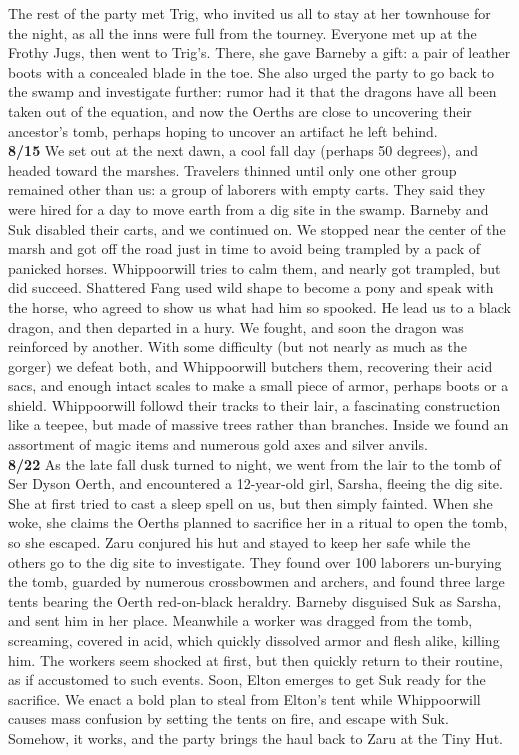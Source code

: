 \documentclass[letterpaper]{article}
\begin{document}
\noindent The rest of the party met Trig, who invited us all to stay at her townhouse for the night, as all the inns were full from the tourney.  Everyone met up at the Frothy Jugs, then went to Trig's.  There, she gave Barneby a gift: a pair of leather boots with a concealed blade in the toe. She also urged the party to go back to the swamp and investigate further: rumor had it that the dragons have all been taken out of the equation, and now the Oerths are close to uncovering their ancestor's tomb, perhaps hoping to uncover an artifact he left behind.\\

\noindent \textbf{8/15} We set out at the next dawn, a cool fall day (perhaps 50 degrees), and headed toward the marshes.  Travelers thinned until only one other group remained other than us: a group of laborers with empty carts.  They said they were hired for a day to move earth from a dig site in the swamp.  Barneby and Suk disabled their carts, and we continued on.  We stopped near the center of the marsh and got off the road just in time to avoid being trampled by a pack of panicked horses.  Whippoorwill tries to calm them, and nearly got trampled, but did succeed.  Shattered Fang used wild shape to become a pony and speak with the horse, who agreed to show us what had him so spooked.  He lead us to a black dragon, and then departed in a hury.  We fought, and soon the dragon was reinforced by another.  With some difficulty (but not nearly as much as the gorger) we defeat both, and Whippoorwill butchers them, recovering their acid sacs, and enough intact scales to make a small piece of armor, perhaps boots or a shield.  Whippoorwill followd their tracks to their lair, a fascinating construction like a teepee, but made of massive trees rather than branches.  Inside we found an assortment of magic items and numerous gold axes and silver anvils.\\

\noindent \textbf{8/22} As the late fall dusk turned to night, we went from the lair to the tomb of Ser Dyson Oerth, and encountered a 12-year-old girl, Sarsha, fleeing the dig site. She at first tried to cast a sleep spell on us, but then simply fainted. When she woke, she claims the Oerths planned to sacrifice her in a ritual to open the tomb, so she escaped.  Zaru conjured his hut and stayed to keep her safe while the others go to the dig site to investigate. They found over 100 laborers un-burying the tomb, guarded by numerous crossbowmen and archers, and found three large tents bearing the Oerth red-on-black heraldry.  Barneby disguised Suk as Sarsha, and sent him in her place. Meanwhile a worker was dragged from the tomb, screaming, covered in acid, which quickly dissolved armor and flesh alike, killing him.  The workers seem shocked at first, but then quickly return to their routine, as if accustomed to such events.  Soon, Elton emerges to get Suk ready for the sacrifice.  We enact a bold plan to steal from Elton's tent while Whippoorwill causes mass confusion by setting the tents on fire, and escape with Suk.  Somehow, it works, and the party brings the haul back to Zaru at the Tiny Hut.\\
\end{document}
